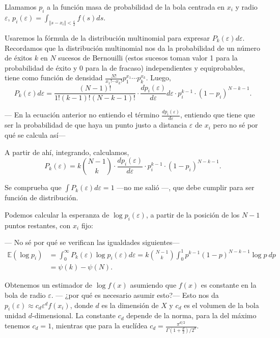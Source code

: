 \documentclass[10pt,a4paper]{article} %
\theoremstyle{definition}
\begin{document}
Llamamos $p_i$ a la función masa de probabilidad  de la bola centrada en $x_i$ y radio $\varepsilon$, $p_i(\varepsilon) = \int_{\Vert s - x_i \Vert < \frac{\varepsilon}{2}}f(s)ds$. 

Usaremos la fórmula de la distribución multinomial para expresar $P_k(\varepsilon)d\varepsilon$. Recordamos que la distribución multinomial nos da la probabilidad de un número de éxitos $k$ en $N$ sucesos de Bernouilli (estos sucesos toman valor 1 para la probabilidad de éxito  y 0 para la de fracaso) independientes y equiprobables, tiene como función de densidad $\frac{N!}{x_1!\cdots x_k!}p_1^{x_1}\cdots p_k^{x_k}$. Luego,\[
P_k(\varepsilon)d\varepsilon = \frac{(N-1)!}{1!(k-1)!(N-k-1)!} \cdot \frac{d p_i(\varepsilon)}{d\varepsilon} d\varepsilon \cdot p_i^{k-1} \cdot (1-p_i)^{N-k-1}.
\]

--- En la ecuación anterior no entiendo el término $ \frac{d p_i(\varepsilon)}{d\varepsilon} $, entiendo que tiene que ser la probabilidad de que haya un punto justo a distancia $\varepsilon$ de $x_i$ pero no sé por qué se calcula así---

A partir de ahí, integrando, calculamos,\[
P_k(\varepsilon) = k\binom{N-1}{k}
\cdot \frac{d p_i(\varepsilon)}{d\varepsilon} \cdot p_i^{k-1} \cdot (1-p_i)^{N-k-1}.
\]

Se comprueba que $\int P_k(\varepsilon)d\varepsilon = 1$ ---no me salió ---, que debe cumplir para ser función de distribución.

Podemos calcular la esperanza de $\log p_i (\varepsilon)$, a partir de la posición de los $N-1$ puntos restantes, con $x_i$ fijo:

--- No sé por qué se verifican las igualdades siguientes---
\begin{align*}
\mathbb{E}(\log p_i) &= \int_0^\infty P_k(\varepsilon) \log p_i(\varepsilon) d\varepsilon =  k\binom{N-1}{k} \int_0^1 p^{k-1}(1-p)^{N-k-1}\log p\ dp\\ &= \psi (k) - \psi(N).
\end{align*}

Obtenemos un estimador de $\log f(x)$ asumiendo que $f(x)$ es constante en la bola de radio $\varepsilon$. --- ¿por qué es necesario asumir esto?--- Esto nos da $p_i (\varepsilon) \approx c_d \varepsilon^d f(x_i)$, donde $d$ es la dimensión de $X$ y $c_d$ es el volumen de la bola unidad $d$-dimensional. La constante $c_d$ depende de la norma, para la del máximo tenemos $c_d=1$, mientras que para la euclídea $c_d=\frac{\pi^{d/2}}{\Gamma\left ( 1+ \frac{d}{2} \right ) / 2^d}$.
\end{document}
